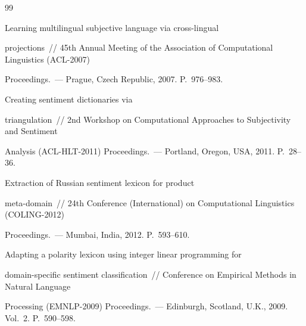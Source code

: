{\small\frenchspacing


{%




\begin{thebibliography}{99}





\vspace*{-3pt}







 Learning multilingual subjective language via cross-lingual


projections~/\!\!/ 45th Annual Meeting of the Association of Computational Linguistics (ACL-2007)


Proceedings.~--- Prague, Czech Republic, 2007. P.~976--983.







 Creating sentiment dictionaries via


triangulation~/\!\!/ 2nd Workshop on Computational Approaches to Subjectivity and Sentiment


Analysis (ACL-HLT-2011) Proceedings.~--- Portland, Oregon, USA, 2011. P.~28--36.







 Extraction of Russian sentiment lexicon for product


meta-domain~/\!\!/ 24th Conference (International) on Computational Linguistics (COLING-2012)


Proceedings.~--- Mumbai, India, 2012. P.~593--610.




 Adapting a polarity lexicon using integer linear programming for


domain-specific sentiment classification~/\!\!/ Conference on Empirical Methods in Natural Language


Processing (EMNLP-2009) Proceedings.~--- Edinburgh, Scotland, U.K., 2009. Vol.~2. P.~590--598.



\end{thebibliography}}}
